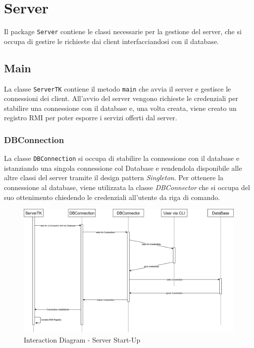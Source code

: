 \section{Server}
Il package \texttt{Server} contiene le classi necessarie per 
la gestione del server, che si occupa di gestire le richieste 
dai client interfacciandosi con il database.

\subsection{Main}
La classe \texttt{ServerTK} contiene il metodo \texttt{main} 
che avvia il server e gestisce le connessioni dei client.
All'avvio del server vengono richieste le credenziali per stabilire 
una connessione con il database e, una volta creata, viene creato un 
registro RMI per poter esporre i servizi offerti dal server.

\subsubsection{DBConnection}
La classe \texttt{DBConnection} si occupa di stabilire
la connessione con il database e 
istanziando una singola connessione col Database e rendendola disponibile 
alle altre classi del server tramite il design pattern \textit{Singleton}.
Per ottenere la connessione al database, viene utilizzata la classe 
\textit{DBConnector} che si occupa del suo ottenimento
chiedendo le credenziali all'utente da riga di comando.
\begin{figure}[H]
  \centering
  \includegraphics[width=\textwidth]{images/UML-interaction-server.png}
  \caption{Interaction Diagram - Server Start-Up}
  \label{fig:interaction-diagram-server}
\end{figure}


